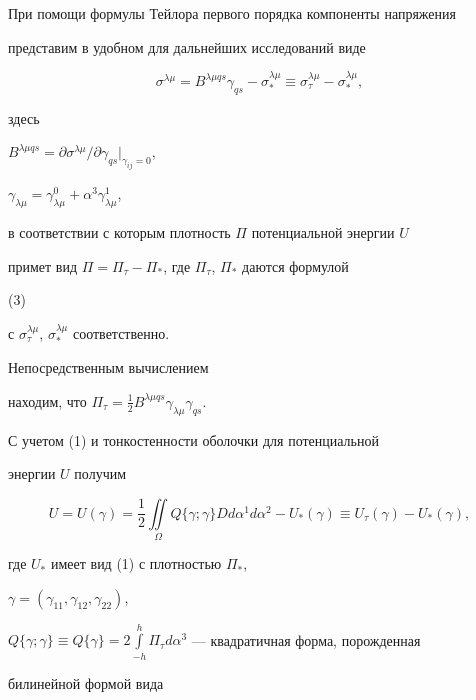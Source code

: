  


При помощи формулы Тейлора первого порядка компоненты напряжения 


представим в удобном для дальнейших исследований виде 


$$ 


\sigma^{\lambda\mu}=B^{\lambda\mu q s}\gamma_{q s}- 


\sigma^{\lambda\mu}_* \equiv\sigma^{\lambda\mu}_\tau- 


\sigma^{\lambda\mu}_*, 


$$ 


здесь 


$B^{\lambda\mu q s}=\partial\sigma^{\lambda\mu}/ 


\partial\gamma_{q s}\big|_{\gamma_{i j}=0}$, 


$\gamma_{\lambda\mu}=\gamma^0_{\lambda\mu}+\alpha^3\gamma^1_{\lambda\mu}$, 


в соответствии с которым плотность $\Pi$ потенциальной энергии $U$ 


примет вид $\Pi=\Pi_\tau-\Pi_*$, где $\Pi_\tau$, $\Pi_*$ даются формулой 


(3) 


с $\sigma^{\lambda\mu}_\tau$, $\sigma^{\lambda\mu}_*$ соответственно. 


Непосредственным вычислением 


находим, что $\Pi_\tau=\frac{1}{2}B^{\lambda\mu q s}\gamma_{\lambda\mu} 


\gamma_{q s}$. 


С учетом (1) и тонкостенности оболочки для потенциальной 


энергии $U$ получим 


\begin{equation} 


U=U(\gamma)=\frac{1}{2}\iint\limits_\Omega Q\{\gamma;\gamma\} 


D d\alpha^1 d\alpha^2-U_*(\gamma)\equiv U_\tau(\gamma) 


-U_*(\gamma), 


\end{equation} 


где $U_*$ имеет вид (1) с плотностью $\Pi_*$, 


$\gamma=(\gamma_{11},\gamma_{12},\gamma_{22})$, 


$Q\{\gamma;\gamma\}\equiv Q\{\gamma\}=2\int\limits^h_{-h} \Pi_\tau 


d\alpha^3$ --- квадратичная форма, порожденная 


билинейной формой вида 


